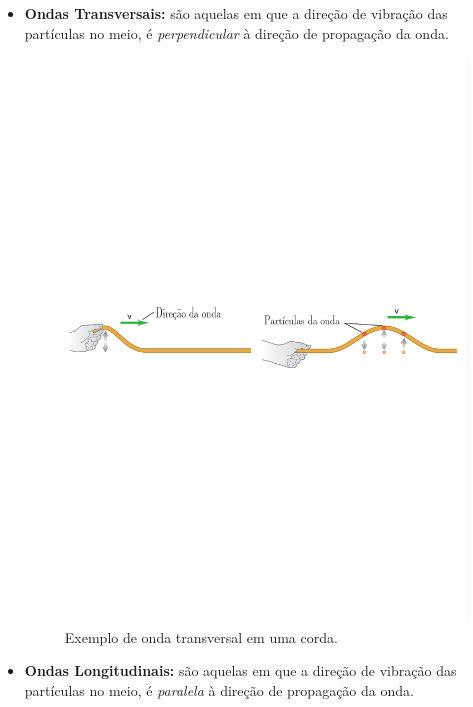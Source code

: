 \documentclass[
    12pt,               %
    openright,          %
    oneside,
    a4paper,            
    english,            %
    brazil              %
    ]{abntex2}
\begin{document}
\begin{itemize}
  \item \textbf{Ondas Transversais:} são aquelas em que a direção de vibração das partículas no meio, é \textit{perpendicular} à direção de propagação da onda.

  \begin{figure}[!htb]
    \caption{\label{fig_onda-transversal}Exemplo de onda transversal em uma corda.}
    \begin{center}
    \includegraphics[scale=0.5]{images/img-1.pdf}
    \end{center}
  \end{figure}

   \item \textbf{Ondas Longitudinais:} são aquelas em que a direção de vibração das partículas no meio, é \textit{paralela} à direção de propagação da onda.


\end{itemize}
\end{document}
